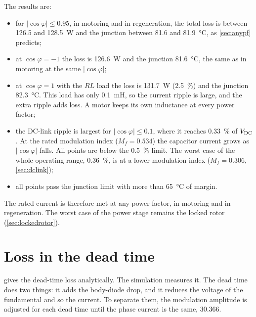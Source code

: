 The results are:
\begin{itemize}
  \item for $|\cos\varphi| \leq 0.95$, in motoring and in regeneration, the total
        loss is between \SI{126.5}{} and \SI{128.5}{\watt} and the junction between
        \SI{81.6}{} and \SI{81.9}{\celsius}, as \cref{sec:anypf} predicts;
  \item at $\cos\varphi = -1$ the loss is \SI{126.6}{\watt} and the junction
        \SI{81.6}{\celsius}, the same as in motoring at the same $|\cos\varphi|$;
  \item at $\cos\varphi = 1$ with the $RL$ load the loss is \SI{131.7}{\watt}
        (\SI{+2.5}{\percent}) and the junction \SI{82.3}{\celsius}. This load has only
        \SI{0.1}{\milli\henry}, so the current ripple is large, and the extra ripple adds
        loss. A motor keeps its own inductance at every power factor;
  \item the DC-link ripple is largest for $|\cos\varphi| \leq 0.1$, where it
        reaches \SI{0.33}{\percent} of $V_{\mathrm{DC}}$. At the rated modulation index
        ($M_f = 0.534$) the capacitor current grows as $|\cos\varphi|$ falls.
        All points are below the \SI{0.5}{\percent} limit. The worst case of the
        whole operating range, \SI{0.36}{\percent}, is at a lower modulation
        index ($M_f = 0.306$, \cref{sec:dclink});
  \item all points pass the junction limit with more than \SI{65}{\celsius} of
        margin.
\end{itemize}
The rated current is therefore met at any power factor, in motoring and in
regeneration. The worst case of the power stage remains the locked rotor
(\cref{sec:lockedrotor}).

\section{Loss in the dead time}
\label{sec:deadtime-loss}

 gives the dead-time loss analytically. The
simulation measures it. The dead time does two things: it adds the
body-diode drop, and it reduces the voltage of the fundamental and so the
current. To separate them, the modulation amplitude is adjusted for each
dead time until the phase current is the same, \SI{30.366}{\Arms}.


